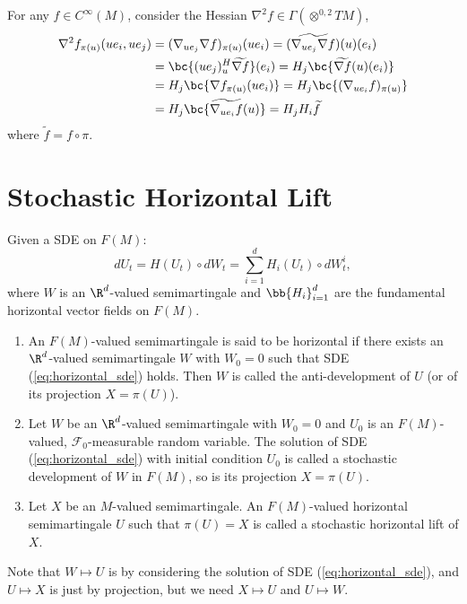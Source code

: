 \begin{exam}[Hessian]
    For any $f \in C^\infty(M)$, consider the Hessian $\nabla^2 f \in \Gamma(\otimes^{0,2}TM)$,
    \begin{align*}
        \nabla^2 f_{\pi(u)}(ue_i,ue_j) &= (\nabla_{ue_j} \nabla f)_{\pi(u)}(ue_i) = (\widetilde{\nabla_{ue_j} \nabla f})(u) (e_i) \\
        &= \bc{(ue_j)_u^H \widetilde{\nabla f}} (e_i) = H_j \bc{\widetilde{\nabla f}(u)(e_i)} \\
        &= H_j \bc{\nabla f_{\pi(u)}(ue_i)} =  H_j \bc{(\nabla_{ue_i} f)_{\pi(u)}}\\
        &= H_j\bc{\widetilde{\nabla_{ue_i} f}(u)} = H_jH_i \widetilde{f}
    \end{align*}
    where $\widetilde{f} = f \circ \pi$.
\end{exam}

\section{Stochastic Horizontal Lift}

Given a SDE on $F(M)$:
\begin{equation}\label{eq:horizontal_sde}
    dU_t = H(U_t) \circ dW_t = \sum_{i=1}^d H_i(U_t) \circ dW^i_t,
\end{equation}
where $W$ is an $\R^d$-valued semimartingale and $\bb{H_i}_{i=1}^d$ are the fundamental horizontal vector fields on $F(M)$.

\begin{defn}
    \begin{enumerate}[label=(\arabic{*})]
        \item An $F(M)$-valued semimartingale is said to be horizontal if there exists an $\R^d$-valued semimartingale $W$ with $W_0 = 0$ such that SDE (\ref{eq:horizontal_sde}) holds. Then $W$ is called the anti-development of $U$ (or of its projection $X = \pi(U)$).

        \item Let $W$ be an $\R^d$-valued semimartingale with $W_0 = 0$ and $U_0$ is an $F(M)$-valued, $\mathcal{F}_0$-measurable random variable. The solution of SDE (\ref{eq:horizontal_sde}) with initial condition $U_0$ is called a stochastic development of $W$ in $F(M)$, so is its projection $X=\pi(U)$.

        \item Let $X$ be an $M$-valued semimartingale. An $F(M)$-valued horizontal semimartingale $U$ such that $\pi(U) = X$ is called a stochastic horizontal lift of $X$.
    \end{enumerate}
\end{defn} 
Note that $W \mapsto U$ is by considering the solution of SDE (\ref{eq:horizontal_sde}), and $U \mapsto X$ is just by projection, but we need $X \mapsto U$ and $U \mapsto W$.

